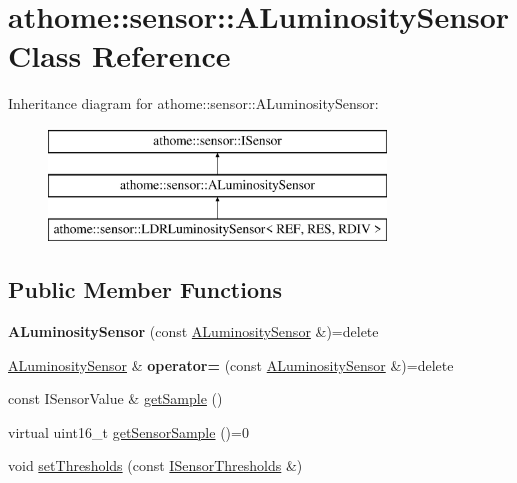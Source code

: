 \hypertarget{classathome_1_1sensor_1_1_a_luminosity_sensor}{}\section{athome\+:\+:sensor\+:\+:A\+Luminosity\+Sensor Class Reference}
\label{classathome_1_1sensor_1_1_a_luminosity_sensor}
Inheritance diagram for athome\+:\+:sensor\+:\+:A\+Luminosity\+Sensor\+:\begin{figure}[H]
\begin{center}
\leavevmode
\includegraphics[height=3.000000cm]{classathome_1_1sensor_1_1_a_luminosity_sensor}
\end{center}
\end{figure}
\subsection*{Public Member Functions}
\begin{DoxyCompactItemize}
\item 
\mbox{\label{classathome_1_1sensor_1_1_a_luminosity_sensor_a550beb44964597870cd5c94a3485bbaf}} 
{\bfseries A\+Luminosity\+Sensor} (const \mbox{\hyperlink{classathome_1_1sensor_1_1_a_luminosity_sensor}{A\+Luminosity\+Sensor}} \&)=delete
\item 
\mbox{\label{classathome_1_1sensor_1_1_a_luminosity_sensor_a9a91cdf883f0f06be50a74ec2e73d710}} 
\mbox{\hyperlink{classathome_1_1sensor_1_1_a_luminosity_sensor}{A\+Luminosity\+Sensor}} \& {\bfseries operator=} (const \mbox{\hyperlink{classathome_1_1sensor_1_1_a_luminosity_sensor}{A\+Luminosity\+Sensor}} \&)=delete
\item 
const I\+Sensor\+Value \& \mbox{\hyperlink{classathome_1_1sensor_1_1_a_luminosity_sensor_a6e0e7bcfe13cd8d8edf6a09f6e230ef8}{get\+Sample}} ()
\item 
virtual uint16\+\_\+t \mbox{\hyperlink{classathome_1_1sensor_1_1_a_luminosity_sensor_ae756f7d7647c2cf695305c8f11aec8d3}{get\+Sensor\+Sample}} ()=0
\item 
void \mbox{\hyperlink{classathome_1_1sensor_1_1_a_luminosity_sensor_aa26ed7176ba600f6900bd249edce71ab}{set\+Thresholds}} (const \mbox{\hyperlink{structathome_1_1sensor_1_1_i_sensor_1_1_i_sensor_thresholds}{I\+Sensor\+Thresholds}} \&)
\end{DoxyCompactItemize}
